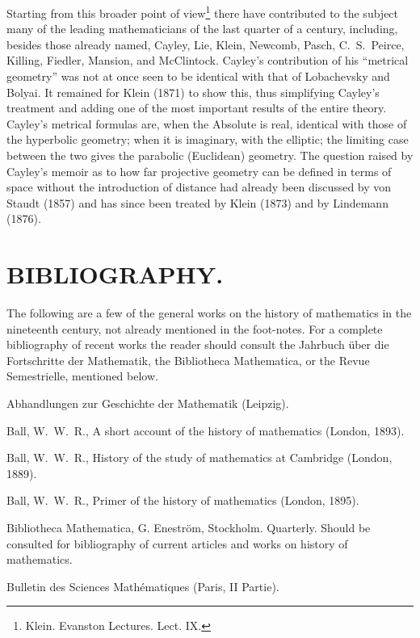\documentclass[oneside]{book}
\begin{document}
{Starting from this broader point of view\footnote{Klein. Evanston
Lectures. Lect. IX.} there have contributed to the subject many of
the leading mathematicians of the last quarter of a century,
including, besides those already named, Cayley, Lie, Klein, Newcomb,
Pasch, C.~S.~Peirce, Killing, Fiedler, Mansion, and
McClintock. Cayley's contribution of his ``metrical geometry'' was
not at once seen to be identical with that of Lobachevsky and
Bolyai. It remained for Klein (1871) to show this, thus simplifying
Cayley's treatment and adding one of the most important results of
the entire theory. Cayley's metrical formulas are, when the Absolute
is real, identical with those of the hyperbolic geometry; when it
is imaginary, with the elliptic; the limiting case between the two
gives the parabolic (Euclidean) geometry. The question raised by
Cayley's memoir as to how far projective geometry can be defined in
terms of space without the introduction of distance had already been
discussed by von Staudt (1857) and has since been treated by Klein
(1873) and by Lindemann (1876).

\backmatter

\chapter{BIBLIOGRAPHY.}


The following are a few of the general works on the history of
mathematics in the nineteenth century, not already mentioned in the
foot-notes. For a complete bibliography of recent works the reader
should consult the Jahrbuch \"uber die Fortschritte der Mathematik,
the Bibliotheca Mathematica, or the Revue Semestrielle, mentioned
below.

\bigskip
Abhandlungen zur Geschichte der Mathematik (Leipzig).

Ball, W.~W.~R., A short account of the history of mathematics
(London, 1893).

Ball, W.~W.~R., History of the study of mathematics at Cambridge
(London, 1889).

Ball, W.~W.~R., Primer of the history of mathematics (London, 1895).

Bibliotheca Mathematica, G. Enestr\"om, Stockholm. Quarterly.
Should be consulted for bibliography of current articles and works
on history of mathematics.

Bulletin des Sciences Math\'ematiques (Paris, II Partie).

}
\end{document}
